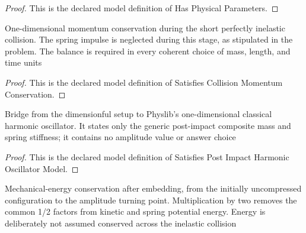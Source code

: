 \begin{proof}
  This is the declared model definition of Has Physical Parameters.
\end{proof}
\begin{definition}
  \label{def:physics:phyx-mini-0260:phyxminiproblems-problemphyxmini0260-satisfiescollisionmomentumconservation}
  One-dimensional momentum conservation during the short perfectly inelastic collision. The spring impulse is neglected during this stage, as stipulated in the problem. The balance is required in every coherent choice of mass, length, and time units
\end{definition}
\begin{proof}
  This is the declared model definition of Satisfies Collision Momentum Conservation.
\end{proof}
\begin{definition}
  \label{def:physics:phyx-mini-0260:phyxminiproblems-problemphyxmini0260-satisfiespostimpactharmonicoscillatormodel}
  Bridge from the dimensionful setup to Physlib's one-dimensional classical harmonic oscillator. It states only the generic post-impact composite mass and spring stiffness; it contains no amplitude value or answer choice
\end{definition}
\begin{proof}
  This is the declared model definition of Satisfies Post Impact Harmonic Oscillator Model.
\end{proof}
\begin{definition}
  \label{def:physics:phyx-mini-0260:phyxminiproblems-problemphyxmini0260-satisfiesenergyconservationafterembedding}
  Mechanical-energy conservation after embedding, from the initially uncompressed configuration to the amplitude turning point. Multiplication by two removes the common 1/2 factors from kinetic and spring potential energy. Energy is deliberately not assumed conserved across the inelastic collision
\end{definition}
